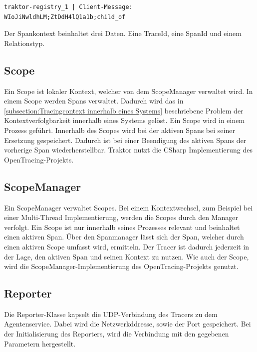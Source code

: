 \begin{minipage}[]{\textwidth}
	\begin{lstlisting}[frame=trBL]
	traktor-registry_1 | Client-Message: WIoJiNwldhLM;ZtDdH4lQ1a1b;child_of
	\end{lstlisting}
	\label{listing:SpanContext-Registry}
\end{minipage} 

Der Spankontext beinhaltet drei Daten. Eine TraceId, eine SpanId und einem Relationstyp.

\subsection{Scope}
\label{subsection:Scope}

Ein Scope ist lokaler Kontext, welcher von dem ScopeManager verwaltet wird. In einem Scope werden Spans verwaltet. Dadurch wird das in \cref{subsection:Tracingcontext innerhalb eines Systems} beschriebene Problem der Kontextverfolgbarkeit innerhalb eines Systems gelöst. Ein Scope wird in einem Prozess geführt. Innerhalb des Scopes wird bei der aktiven Spans bei seiner Ersetzung gespeichert. Dadurch ist bei einer Beendigung des aktiven Spans der vorherige Span wiederherstellbar. Traktor nutzt die CSharp Implementierung des OpenTracing-Projekts.

\subsection{ScopeManager}
\label{subsection:ScopeManager}
Ein ScopeManager verwaltet Scopes. Bei einem Kontextwechsel, zum Beispiel bei einer Multi-Thread Implementierung, werden die Scopes durch den Manager verfolgt. Ein Scope ist nur innerhalb seines Prozesses relevant und beinhaltet einen aktiven Span. Über den Spanmanager lässt sich der Span, welcher durch einen aktiven Scope umfasst wird, ermitteln. Der Tracer ist dadurch jederzeit in der Lage, den aktiven Span und seinen Kontext zu nutzen. Wie auch der Scope, wird die ScopeManager-Implementierung des OpenTracing-Projekts genutzt. 

\subsection{Reporter}
\label{subsection:Reporter}
Die Reporter-Klasse kapselt die UDP-Verbindung des Tracers zu dem Agentenservice. Dabei wird die Netzwerkddresse, sowie der Port gespeichert. Bei der Initialisierung des Reporters, wird die Verbindung mit den gegebenen Parametern hergestellt.

